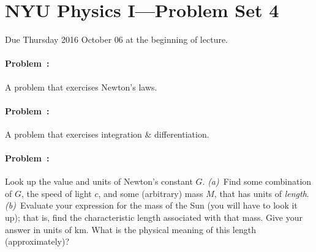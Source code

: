 \documentclass[12pt]{article}
\newcounter{problem}
\begin{document}
\sloppy\sloppypar\raggedbottom\frenchspacing\thispagestyle{empty}

\section*{NYU Physics I---Problem Set 4}

Due Thursday 2016 October 06 at the beginning of lecture.

\paragraph{Problem~\theproblem:}%
A problem that exercises Newton's laws.

\paragraph{Problem~\theproblem:}%
A problem that exercises integration \& differentiation.

\paragraph{Problem~\theproblem:}%
Look up the value and units of Newton's constant $G$.
\textsl{(a)}~Find some combination of $G$, the speed of light $c$, and
some (arbitrary) mass $M$, that has units of \emph{length}.
\textsl{(b)}~Evaluate your expression for the mass of the Sun (you
will have to look it up); that is, find the characteristic length
associated with that mass.  Give your answer in units of km.  What is
the physical meaning of this length (approximately)?
\end{document}
